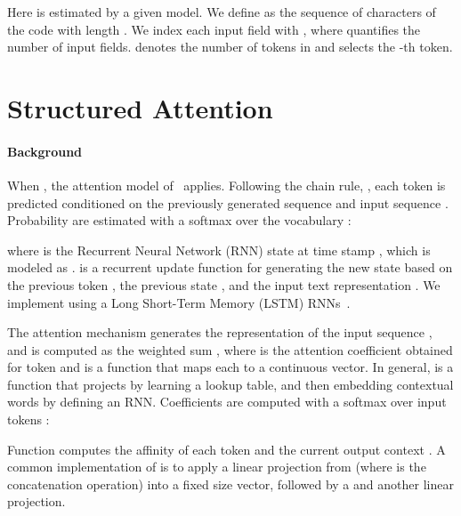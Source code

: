 \documentclass[11pt]{article}
\begin{document}
Here  is estimated by a given model.
We define  as the sequence of characters of the code with
length . We index each input field with , where 
quantifies the number of input fields.  denotes the number of tokens in  and  selects the -th token.








\section{Structured Attention}
\label{sec:structure}

\paragraph{Background} When , the attention model of~ applies.
Following the chain rule,
,
each token  is predicted conditioned on the previously generated
sequence  and input sequence . Probability are estimated with a
softmax over the vocabulary :

where  is the Recurrent Neural Network (RNN) state at
time stamp , which is modeled as .
 is a recurrent update function for generating the new state
 based on the previous token
, the previous state , and the input text
representation . We implement  using a Long
Short-Term Memory (LSTM) RNNs~\cite{Hochreiter:1997:LSM:1246443.1246450}.

The attention mechanism generates the representation of the input
sequence , and  is computed as
the weighted sum ,
where  is the attention coefficient obtained for token  and  is a
function that maps each  to a continuous vector. In general,  is a
function that projects  by learning a lookup table, and then embedding
contextual words by defining an RNN. Coefficients  are computed
with a softmax over input tokens :

Function  computes the affinity of each token  and the current
output context . A common implementation of  is to apply a
linear projection from  (where  is the concatenation operation)
into a fixed size vector, followed by a  and another linear projection.
\end{document}
